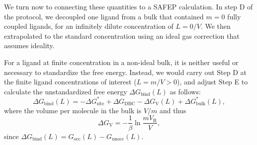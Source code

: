 \documentclass[9pt,tutorial,pubversion]{Styling/livecoms}
\begin{document}
We turn now to connecting these quantities to a SAFEP calculation.  In step D of the protocol, we decoupled one ligand from a bulk that contained $m=0$ fully coupled ligands, for an infinitely dilute concentration of $L=0/V$. We then extrapolated to the standard concentration using an ideal gas correction that assumes ideality.

For a ligand at finite concentration in a non-ideal bulk, it is neither useful or necessary to standardize the free energy. Instead, we would carry out Step D at the finite ligand concentrations of interest ($L=m/V>0$), and adjust Step E to calculate the unstandardized free energy $\Delta G_\mathrm{bind}(L)$ as follows: 
\begin{equation}
\Delta G_\mathrm{bind}(L)= - \Delta G_\mathrm{site}^* + \Delta G_\mathrm{DBC} -\Delta G_\mathrm{V}(L)+ \Delta G^*_\mathrm{bulk}(L),
\end{equation} 
where the volume per molecule in the bulk is $V/m$ and thus \begin{equation}
\label{eq:idealGas}
    \Delta G_\mathrm{V}= -\frac{1}{\beta} \ln \frac{m V_\mathrm{R}}{V}, 
\end{equation}
since
    $\Delta G_\mathrm{bind}(L) = G_\mathrm{occ}(L) - G_\mathrm{unocc}(L)$.
\end{document}
